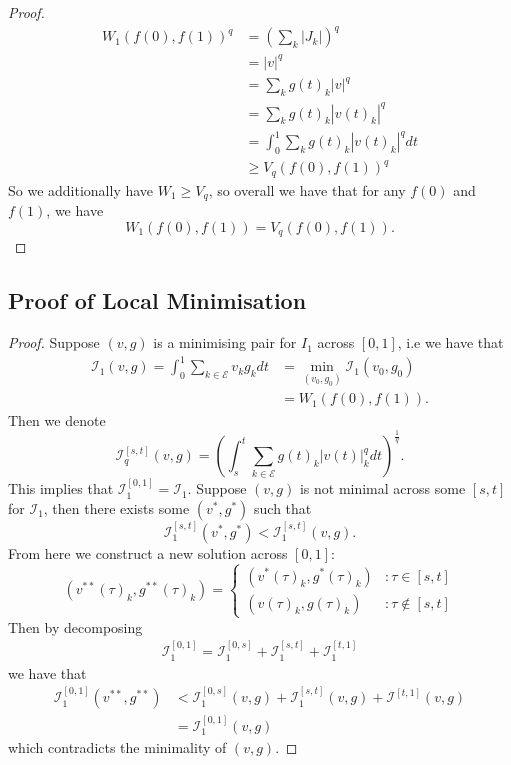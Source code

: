 \documentclass[conference]{IEEEtran}
\newcommand{\EE}{\mathcal{E}}
\theoremstyle{ieeestyle}
\begin{document}
\begin{proof}
    \begin{align*}
        W_1(f(0),f(1))^q &= \left(\sum_{k}|J_k|\right)^q \\
        &= |v|^q \\
        &= \sum_k g(t)_k|v|^q \\
        &= \sum_k g(t)_k |v(t)_k|^q \\
        &= \int_0^1 \sum_k g(t)_k |v(t)_k|^q dt \\
        &\geq V_q(f(0),f(1))^q
    \end{align*}
    So we additionally have $W_1 \geq V_q$, so overall we have that for any $f(0)$ and $f(1)$, we have 
    \begin{equation*}
        W_1(f(0),f(1)) = V_q(f(0),f(1)).
    \end{equation*}
\end{proof}
\subsection{Proof of Local Minimisation}\label{appendix: sol}
\begin{proof}
    Suppose $(v,g)$ is a minimising pair for $I_1$ across $[0,1]$, i.e we have that 
    \begin{align*}
        \mathcal{I}_1(v,g) = \int_0^1 \sum_{k \in \EE}v_kg_k dt &= \min_{(v_0,g_0)} \mathcal{I}_1(v_0,g_0) \\
        &= W_1(f(0),f(1)).
    \end{align*}
    Then we denote
    \begin{equation*}
        \mathcal{I}_q^{[s,t]}(v,g) = \left(\int_s^t \sum_{k \in \EE} g(t)_k |v(t)|_k^q dt \right)^{\frac{1}{q}}.
    \end{equation*}
    This implies that $\mathcal{I}_1^{[0,1]} = \mathcal{I}_1$. Suppose $(v,g)$ is not minimal across some $[s,t]$ for $\mathcal{I}_1$, then there exists some $(v^*,g^*)$ such that 
    \begin{equation*}
        \mathcal{I}_1^{[s,t]}(v^*,g^*) < \mathcal{I}_1^{[s,t]}(v,g).
    \end{equation*}
    From here we construct a new solution across $[0,1]$:
    \begin{equation*}
        (v^{**}(\tau)_k,g^{**}(\tau)_k) = \begin{cases}
            (v^*(\tau)_k,g^*(\tau)_k) &: \tau \in [s,t] \\
            (v(\tau)_k,g(\tau)_k) &: \tau \not \in [s,t]
        \end{cases}
    \end{equation*}
    Then by decomposing
    \begin{align*}
        \mathcal{I}_1^{[0,1]} = \mathcal{I}_1^{[0,s]} + \mathcal{I}_1^{[s,t]} + \mathcal{I}_1^{[t,1]} 
    \end{align*}
    we have that 
    \begin{align*}
        \mathcal{I}_1^{[0,1]}(v^{**},g^{**}) &< \mathcal{I}_1^{[0,s]}(v,g) + \mathcal{I}_1^{[s,t]}(v,g) + \mathcal{I}^{[t,1]}(v,g) \\
        &= \mathcal{I}_1^{[0,1]}(v,g)
    \end{align*}
    which contradicts the minimality of $(v,g)$.
\end{proof}
\end{document}
